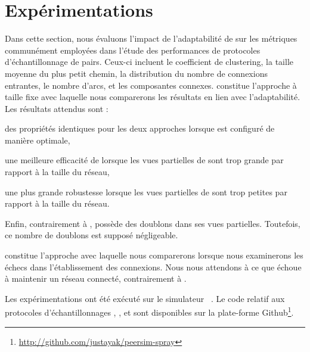 
\section{Expérimentations}

Dans cette section, nous évaluons l'impact de l'adaptabilité de \SPRAY sur les
métriques communément employées dans l'étude des performances de protocoles
d'échantillonnage de pairs. Ceux-ci incluent le coefficient de clustering, la
taille moyenne du plus petit chemin, la distribution du nombre de connexions
entrantes, le nombre d'arcs, et les composantes connexes. \CYCLON constitue
l'approche à taille fixe avec laquelle nous comparerons les résultats en lien
avec l'adaptabilité. Les résultats attendus sont :
\begin{inparaenum}
\item des propriétés identiques pour les deux approches lorsque \CYCLON est
  configuré de manière optimale,
\item une meilleure efficacité de \SPRAY lorsque les vues partielles de \CYCLON
  sont trop grande par rapport à la taille du réseau,
\item une plus grande robustesse lorsque les vues partielles de \CYCLON sont
  trop petites par rapport à la taille du réseau.
\item Enfin, contrairement à \CYCLON, \SPRAY possède des doublons dans ses vues
  partielles. Toutefois, ce nombre de doublons est supposé négligeable.
\end{inparaenum}
\SCAMP constitue l'approche avec laquelle nous comparerons \SPRAY lorsque nous
examinerons les échecs dans l'établissement des connexions. Nous nous attendons
à ce que \SCAMP échoue à maintenir un réseau connecté, contrairement à \SPRAY.

Les expérimentations ont été exécuté sur le simulateur
\PEERSIM~\cite{montresor2009peersim}. Le code relatif aux protocoles
d'échantillonnages \CYCLON, \SCAMP, et \SPRAY sont disponibles sur la
plate-forme Github\footnote{\url{http://github.com/justayak/peersim-spray}}.

